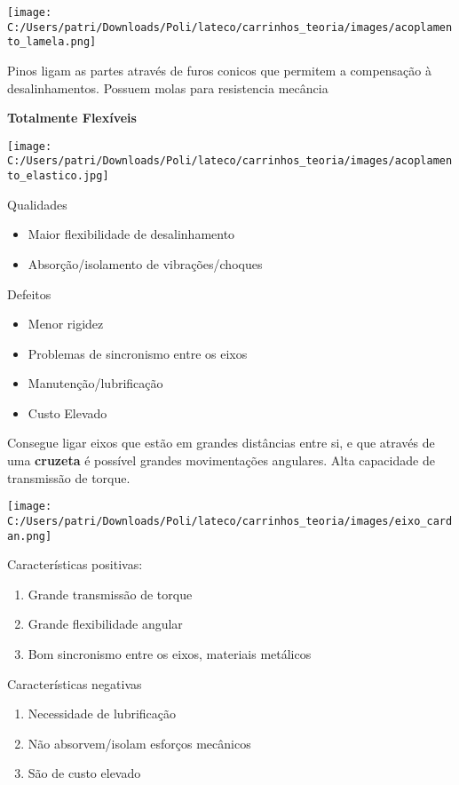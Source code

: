 \begin{namedtheorem}[Elásticos]
	\begin{center}
	\texttt{[image: C:/Users/patri/Downloads/Poli/lateco/carrinhos\_teoria/images/acoplamento\_lamela.png]}
	\end{center}		
	
	Pinos ligam as partes através de furos conicos que permitem a compensação à desalinhamentos. Possuem molas para resistencia mecância
	
	\textbf{Totalmente Flexíveis}
	
	\begin{center}
	\texttt{[image: C:/Users/patri/Downloads/Poli/lateco/carrinhos\_teoria/images/acoplamento\_elastico.jpg]}
	\end{center}		
	
	Qualidades
	\begin{itemize}
		\item Maior flexibilidade de desalinhamento
		\item Absorção/isolamento de vibrações/choques
	\end{itemize}
	
	Defeitos
	\begin{itemize}
		\item Menor rigidez
		\item Problemas de sincronismo entre os eixos
		\item Manutenção/lubrificação
		\item Custo Elevado
	\end{itemize}
	
\end{namedtheorem}

\begin{namedtheorem}

Consegue ligar eixos que estão em grandes distâncias entre si, e que através de uma \textbf{cruzeta} é possível grandes movimentações angulares. Alta capacidade de transmissão de torque.

	\begin{center}
	\texttt{[image: C:/Users/patri/Downloads/Poli/lateco/carrinhos\_teoria/images/eixo\_cardan.png]}
	\end{center}		
	
	Características positivas:
	
	\begin{enumerate}
		\item Grande transmissão de torque
		\item Grande flexibilidade angular
		\item Bom sincronismo entre os eixos, materiais metálicos
	\end{enumerate}
	
	Características negativas
	
	\begin{enumerate}
		\item Necessidade de lubrificação 
		\item Não absorvem/isolam esforços mecânicos
		\item São de custo elevado
	\end{enumerate}

\end{namedtheorem}

